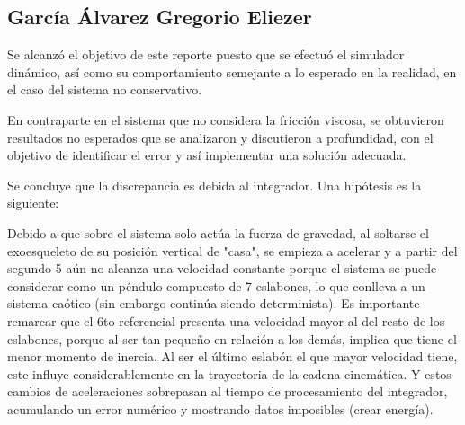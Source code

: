 \subsection{García Álvarez Gregorio Eliezer}
\noindent Se alcanzó el objetivo de este reporte  puesto que se efectuó el 
simulador dinámico, así como su comportamiento semejante a lo esperado en 
la realidad, en el caso del sistema no conservativo.

En contraparte en el sistema que no considera la fricción viscosa, se 
obtuvieron resultados no esperados que se analizaron y discutieron a 
profundidad, con el objetivo de identificar el error y así implementar 
una solución adecuada. 

Se concluye que la discrepancia es debida al integrador. Una hipótesis 
es la siguiente:

Debido a que sobre el sistema solo actúa la fuerza de gravedad, al 
soltarse el exoesqueleto de su posición vertical de "casa", se empieza 
a acelerar y a partir del segundo 5 aún no alcanza una velocidad 
constante porque el sistema se puede considerar como un péndulo 
compuesto de 7 eslabones, lo que conlleva a un sistema caótico 
(sin embargo continúa siendo determinista). Es importante remarcar 
que el 6to referencial presenta una velocidad mayor al del resto 
de los eslabones, porque al ser tan pequeño en relación a los demás, 
implica que tiene el menor momento de inercia. Al ser el último 
eslabón el que mayor velocidad tiene, este influye considerablemente 
en la trayectoria de la cadena cinemática. Y estos cambios de 
aceleraciones sobrepasan al tiempo de procesamiento del integrador,  
acumulando un error numérico y mostrando datos imposibles (crear energía).
